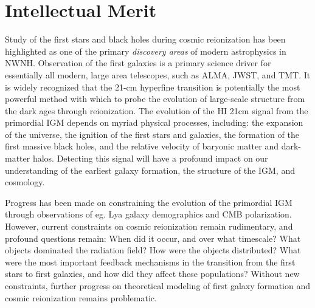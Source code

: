 \documentclass[preprint]{aastex}
\begin{document}


\section*{Intellectual Merit}

Study of the first stars and black holes during cosmic reionization has been highlighted as one
of the primary {\sl discovery areas} of modern astrophysics in NWNH. Observation of the
first galaxies is a primary science driver for essentially all modern, large area telescopes,
such as ALMA, JWST, and TMT.  It is widely recognized that 
the 21-cm hyperfine transition is potentially the most
powerful method with which to probe the evolution of large-scale structure from the dark ages through
reionization.  The evolution of the HI 21cm signal from the primordial IGM
depends on myriad physical processes, including:  the expansion of
the universe, the ignition of the first stars and galaxies, the formation of
the first massive black holes, and the relative
velocity of baryonic matter and dark-matter halos.
Detecting this signal will have a profound impact on our understanding of the earliest
galaxy formation, the structure of the IGM, and cosmology.

Progress has been made on constraining the evolution of the primordial IGM through
observations of eg. Lya galaxy demographics and CMB polarization. However,  
current constraints on cosmic reionization remain rudimentary, and profound questions remain: 
When did it occur, and over what timescale?  What objects dominated the radiation field?
How were the objects distributed? What were the most important feedback mechanisms in the transition
from the first stars to first galaxies, and how did they affect these populations?
Without new constraints, further progress on theoretical modeling of first galaxy formation and cosmic
reionization remains problematic.  
\end{document}
